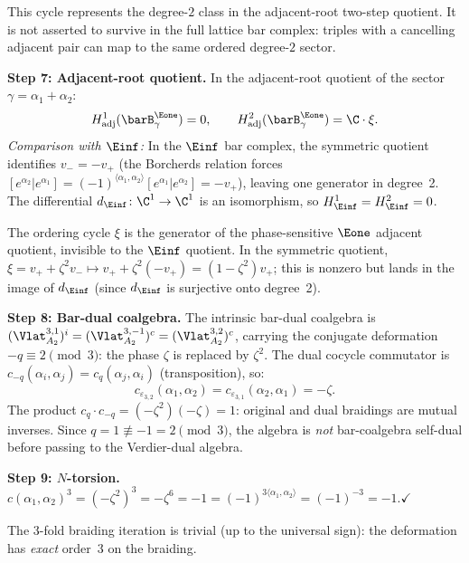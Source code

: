 \begin{computation}[\texorpdfstring{$A_2$}{A_2} at the Coxeter root: \texorpdfstring{$N = 3$}{N = 3}, \texorpdfstring{$q = 1$}{q = 1}]
This cycle represents the degree-$2$ class in the adjacent-root
two-step quotient. It is not asserted to survive in the full lattice
bar complex: triples with a cancelling adjacent pair can map to the
same ordered degree-$2$ sector.
\smallskip

\noindent\textbf{Step 7: Adjacent-root quotient.}
In the adjacent-root quotient of the sector
$\gamma = \alpha_1 + \alpha_2$:
\[
H^1_{\mathrm{adj}}(\barB^{\Eone}_\gamma) = 0, \qquad
H^2_{\mathrm{adj}}(\barB^{\Eone}_\gamma) = \C \cdot \xi.
\]
\emph{Comparison with $\Einf$:}
In the $\Einf$ bar complex, the symmetric quotient identifies
$v_- = -v_+$ (the Borcherds relation forces
$[e^{\alpha_2} | e^{\alpha_1}]
= (-1)^{\langle\alpha_1,\alpha_2\rangle}[e^{\alpha_1} | e^{\alpha_2}]
= -v_+$), leaving one generator in degree~2.
The differential $d_{\Einf} \colon \C^1 \to \C^1$ is an isomorphism,
so $H^1_{\Einf} = H^2_{\Einf} = 0$.

The ordering cycle $\xi$ is the generator of the phase-sensitive
$\Eone$ adjacent quotient, invisible to the $\Einf$ quotient.
In the symmetric quotient, $\xi = v_+ + \zeta^2 v_-
\mapsto v_+ + \zeta^2(-v_+) = (1 - \zeta^2)v_+$;
this is nonzero but lands in the image of $d_{\Einf}$
(since $d_{\Einf}$ is surjective onto degree~2).
\smallskip

\noindent\textbf{Step 8: Bar-dual coalgebra.}
The intrinsic bar-dual coalgebra is
$(\Vlat_{A_2}^{3,1})^i = (\Vlat_{A_2}^{3,-1})^c
= (\Vlat_{A_2}^{3,2})^c$, carrying the conjugate deformation
$-q \equiv 2 \pmod{3}$: the phase $\zeta$ is replaced by $\zeta^2$.
The dual cocycle commutator is
$c_{-q}(\alpha_i,\alpha_j) = c_q(\alpha_j,\alpha_i)$
(transposition), so:
\[
c_{\varepsilon_{3,2}}(\alpha_1,\alpha_2)
= c_{\varepsilon_{3,1}}(\alpha_2,\alpha_1) = -\zeta.
\]
The product $c_q \cdot c_{-q} = (-\zeta^2)(-\zeta) = 1$: original and
dual braidings are mutual inverses. Since
$q = 1 \not\equiv -1 = 2 \pmod{3}$, the algebra is \emph{not}
bar-coalgebra self-dual before passing to the Verdier-dual algebra.
\smallskip

\noindent\textbf{Step 9: $N$-torsion.}
$c(\alpha_1,\alpha_2)^3 = (-\zeta^2)^3 = -\zeta^6 = -1
= (-1)^{3\langle\alpha_1,\alpha_2\rangle} = (-1)^{-3} = -1$.\;$\checkmark$

The 3-fold braiding iteration is trivial (up to the universal sign):
the deformation has \emph{exact} order~$3$ on the braiding.
\end{computation}



